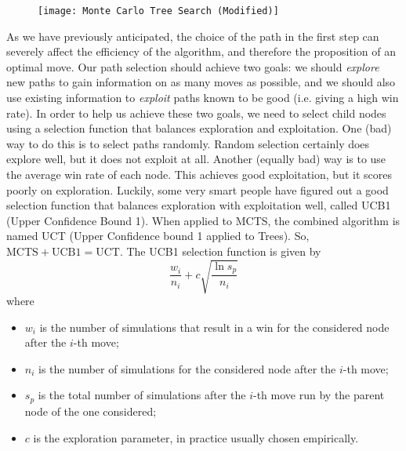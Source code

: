 \begin{figure}[h!t]
\centering
\texttt{[image: Monte Carlo Tree Search (Modified)]}
\caption{}\label{Monte_Carlo_Tree_Search}
\end{figure}

As we have previously anticipated, the choice of the path in the first step can severely affect the efficiency of the algorithm, and therefore the proposition of an optimal move. Our path selection should achieve two goals: we should \emph{explore} new paths to gain information on as many moves as possible, and we should also use existing information to \emph{exploit} paths known to be good (i.e. giving a high win rate). In order to help us achieve these two goals, we need to select child nodes using a selection function that balances exploration and exploitation. One (bad) way to do this is to select paths randomly. Random selection certainly does explore well, but it does not exploit at all. Another (equally bad) way is to use the average win rate of each node. This achieves good exploitation, but it scores poorly on exploration. Luckily, some very smart people have figured out a good selection function that balances exploration with exploitation well, called UCB1 (Upper Confidence Bound 1). When applied to MCTS, the combined algorithm is named UCT (Upper Confidence bound 1 applied to Trees). So, $\text{MCTS}+\text{UCB1}=\text{UCT}$. The UCB1 selection function is given by
\begin{equation}
\frac{w_i}{n_i}+c\sqrt{\frac{\ln{s_p}}{n_i}}
\end{equation}
where
\begin{itemize}
\item $w_i$ is the number of simulations that result in a win for the considered node after the $i$-th move;
\item $n_i$ is the number of simulations for the considered node after the $i$-th move;
\item $s_p$ is the total number of simulations after the $i$-th move run by the parent node of the one considered;
\item $c$ is the exploration parameter, in practice usually chosen empirically.
\end{itemize}
